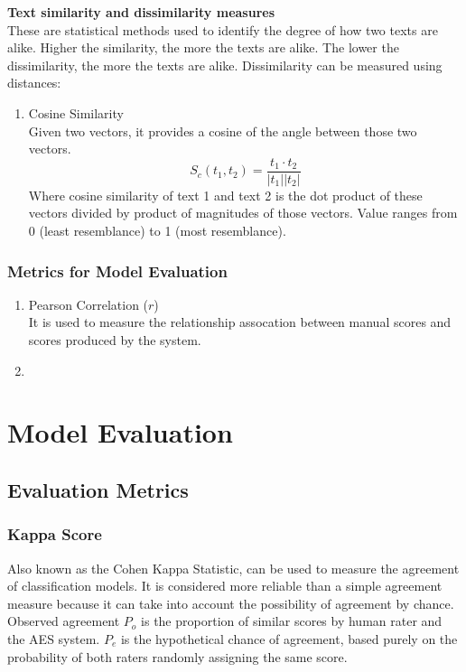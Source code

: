 \documentclass{article}
\begin{document}
	\textbf{Text similarity and dissimilarity measures} \\
	These are statistical methods used to identify the degree of how two texts are alike. Higher the similarity, the more the texts are alike. The lower the dissimilarity, the more the texts are alike. Dissimilarity can be measured using distances:
	\begin{enumerate}
		\item Cosine Similarity \\ Given two vectors, it provides a cosine of the angle between those two vectors.
		$$S_c (t_1, t_2) = \frac{t_1 \cdot t_2}{|t_1||t_2|}$$ Where cosine similarity of text 1 and text 2 is the dot product of these vectors divided by product of magnitudes of those vectors. Value ranges from 0 (least resemblance) to 1 (most resemblance).
	\end{enumerate}

\subsubsection*{Metrics for Model Evaluation}
\begin{enumerate}
	\item Pearson Correlation ($r$) \\ It is used to measure the relationship assocation between manual scores and scores produced by the system.
	\item 
\end{enumerate}


\section{Model Evaluation}
\subsection{Evaluation Metrics} 
\subsubsection{Kappa Score}
Also known as the Cohen Kappa Statistic, can be used to measure the agreement of classification models. It is considered more reliable than a simple agreement measure because it can take into account the possibility of agreement by chance. \\ Observed agreement $P_o$ is the proportion of similar scores by human rater and the AES system. $P_e$ is the hypothetical chance of agreement, based purely on the probability of both raters randomly assigning the same score. 
\end{document}
